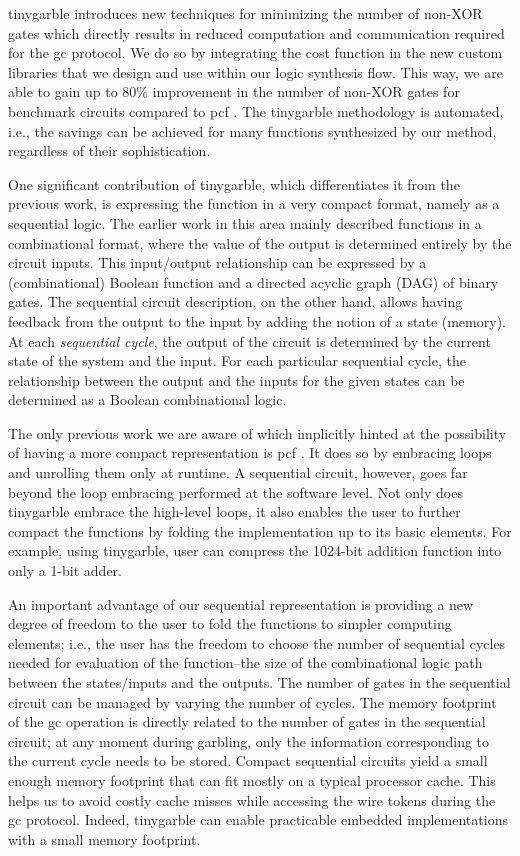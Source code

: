 \gls{tinygarble} introduces new techniques for minimizing the number of non-XOR gates which directly results in reduced computation and communication required for the \acrshort{gc} protocol.
We do so by integrating the cost function in the new custom libraries that we design and use within our logic synthesis flow.
This way, we are able to gain up to $80\%$ improvement in the number of non-XOR gates for benchmark circuits compared to \gls{pcf} \cite{kreuter2013pcf}.
The \gls{tinygarble} methodology is automated, i.e., the savings can be achieved for many functions synthesized by our method, regardless of their sophistication.

One significant contribution of \gls{tinygarble}, which differentiates it from the previous work, is expressing the function in a very compact format, namely as a sequential logic.
The earlier work in this area mainly described functions in a combinational format, where the value of the output is determined entirely by the circuit inputs.
This input/output relationship can be expressed by a (combinational) Boolean function and a directed acyclic graph (DAG) of binary gates.
The sequential circuit description, on the other hand, allows having feedback from the output to the input by adding the notion of a state (memory).
At each \emph{sequential cycle}, the output of the circuit is determined by the current state of the system and the input.
For each particular sequential cycle, the relationship between the output and the inputs for the given states can be determined as a Boolean combinational logic.

The only previous work we are aware of which implicitly hinted at the possibility of having a more compact representation is \gls{pcf} \cite{kreuter2013pcf}.
It does so by embracing loops and unrolling them only at runtime.
A sequential circuit, however, goes far beyond the loop embracing performed at the software level.
Not only does \gls{tinygarble} embrace the high-level loops, it also enables the user to further compact the functions by folding the implementation up to its basic elements.
For example, using \gls{tinygarble}, user can compress the 1024-bit addition function into only a 1-bit adder.

An important advantage of our sequential representation is providing a new degree of freedom to the user to fold the functions to simpler computing elements; i.e., the user has the freedom to choose the number of sequential cycles needed for evaluation of the function--the size of the combinational logic path between the states/inputs and the outputs.
The number of gates in the sequential circuit can be managed by varying the number of cycles.
The memory footprint of the \acrshort{gc} operation is directly related to the number of gates in the sequential circuit; at any moment during garbling, only the information corresponding to the current cycle needs to be stored.
Compact sequential circuits yield a small enough memory footprint that can fit mostly on a typical processor cache.
This helps us to avoid costly cache misses while accessing the wire tokens during the \acrshort{gc} protocol.
Indeed, \gls{tinygarble} can enable practicable embedded implementations with a small memory footprint.

